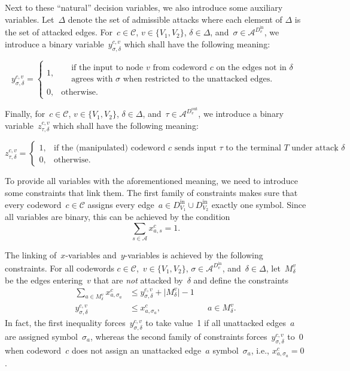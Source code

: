 \documentclass[11pt,a4paper]{article}
\theoremstyle{definition}
\begin{document}
Next to these ``natural'' decision variables, we also introduce some
auxiliary variables. Let~$\Delta$ denote the set of admissible attacks where each element of $\Delta$ 
is the set of attacked edges.
For~$c \in \mathcal{C}$, $v \in \{V_1,V_2\}$, $\delta \in \Delta$, and~$\sigma \in
\mathcal{A}^{D^{\text{in}}_v}$, we introduce a binary
variable~$y^{c,v}_{\sigma,\delta}$ which shall have the following meaning:

\[
  y^{c,v}_{\sigma,\delta}
  =
  \begin{cases}
    1, & \begin{aligned}
         & \text{if the input to node~$v$ from codeword~$c$ on the edges not in $\delta$} \\
         & \text{agrees with~$\sigma$ when restricted to the unattacked edges.}
         \end{aligned} \\
    0, & \text{otherwise}.
  \end{cases}
\]

Finally, for~$c \in \mathcal{C}$, $v \in \{V_1,V_2\}$, $\delta \in \Delta$,
and~$\tau \in \mathcal{A}^{D^{\text{out}}_v}$, we introduce a binary variable~$z^{c,v}_{\tau,\delta}$ which shall have the following meaning: 

\[
  z^{c,v}_{\tau,\delta}
  =
  \begin{cases}
    1, & \text{if the
(manipulated) codeword~$c$ sends input~$\tau$ to the terminal~$T$ under
attack~$\delta$}, \\
    0, & \text{otherwise}.
  \end{cases}
\]

To provide all variables with the aforementioned meaning, we need to introduce
some constraints that link them.
The first family of constraints makes sure that every codeword~$c \in
\mathcal{C}$ assigns every edge~$a \in D^{\text{in}}_{V_1} \cup
D^{\text{in}}_{V_2}$ exactly one symbol.
Since all variables are binary, this can be achieved by the condition
\[
  \sum_{s \in \mathcal{A}} x^c_{a,s} = 1.
\]

The linking of~$x$-variables and~$y$-variables is achieved by the following
constraints.
For all codewords $c \in \mathcal{C}$,~$v \in \{V_1,V_2\}$, $\sigma \in
\mathcal{A}^{D^{\text{in}}_v}$, and~$\delta \in \Delta$, let~$M^v_\delta$
be the edges entering~$v$ that are \emph{not} attacked by~$\delta$
and define the constraints
%
\begin{align*}
  \sum_{a \in M^v_\delta} x^c_{a,\sigma_a}
  &\leq
    y^{c,v}_{\sigma,\delta} + \lvert M^v_\delta \rvert - 1 &&\\
  y^{c,v}_{\sigma,\delta}
  &\leq
    x^c_{a,\sigma_a}, && a \in M^v_\delta.
\end{align*}
%
In fact, the first inequality forces~$y^{c,v}_{\sigma,\delta}$ to take
value~1 if all unattacked edges~$a$ are assigned symbol~$\sigma_a$, whereas
the second family of constraints forces~$y^{c,v}_{\sigma,\delta}$ to~0 when
codeword~$c$ does not assign an unattacked edge~$a$ symbol~$\sigma_a$, i.e.,
$x^c_{a,\sigma_a} = 0$.
\end{document}
